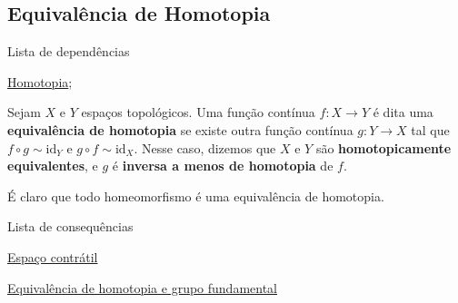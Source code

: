 \subsection{Equivalência de Homotopia}
\label{equiv-homotopia}
\begin{titlemize}{Lista de dependências}
	\item \hyperref[homotopia-def]{Homotopia};\\
\end{titlemize}

\begin{defi}
	Sejam $X$ e $Y$ espaços topológicos. Uma função contínua $f:X\to Y$ é dita uma \textbf{equivalência de homotopia} se existe outra função contínua $g:Y\to X$ tal que $f\circ g \sim \text{id}_Y$ e $g\circ f \sim \text{id}_X$. Nesse caso, dizemos que $X$ e $Y$ são \textbf{homotopicamente equivalentes}, e $g$ é \textbf{inversa a menos de homotopia} de $f$.
\end{defi}

É claro que todo homeomorfismo é uma equivalência de homotopia.

\begin{titlemize}{Lista de consequências}
    \item \hyperref[espaco-contratil-def]{Espaço contrátil}
	\item \hyperref[equiv-homotopia-induz-iso]{Equivalência de homotopia e grupo fundamental}
\end{titlemize}

